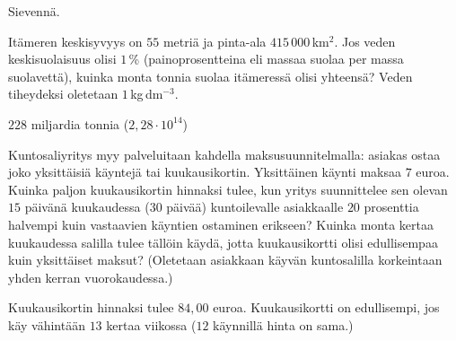 \begin{tehtava}
\begin{vastaus}
	\end{vastaus}
	\end{tehtava}

	\begin{tehtava}
Sievennä.
	 \begin{vastaus}
	 \end{vastaus}
	\end{tehtava}

\begin{tehtava}
Itämeren keskisyvyys on $55$ metriä ja pinta-ala $415\,000$\,km$^2$. Jos veden keskisuolaisuus olisi $1$\,\% (painoprosentteina eli massaa suolaa per massa suolavettä), kuinka monta tonnia suolaa itämeressä olisi yhteensä? Veden tiheydeksi oletetaan $1\,$kg\,dm$^{-3}$.
	\begin{vastaus}
	$228$ miljardia tonnia ($2,28\cdot10^{14}$)
	\end{vastaus}
\end{tehtava}	

	\begin{tehtava}
	\begin{vastaus}
	\alakohdat{
	§ $100$\,\%.
	§ $0,96$\,\%
	}
	\end{vastaus}
	\end{tehtava}
	
\begin{tehtava}
Kuntosaliyritys myy palveluitaan kahdella maksusuunnitelmalla: asiakas ostaa joko yksittäisiä käyntejä tai kuukausikortin. Yksittäinen käynti maksaa $7$ euroa. Kuinka paljon kuukausikortin hinnaksi tulee, kun yritys suunnittelee sen olevan $15$ päivänä kuukaudessa ($30$ päivää) kuntoilevalle asiakkaalle $20$ prosenttia halvempi kuin vastaavien käyntien ostaminen erikseen? Kuinka monta kertaa kuukaudessa salilla tulee tällöin käydä, jotta kuukausikortti olisi edullisempaa kuin yksittäiset maksut? (Oletetaan asiakkaan käyvän kuntosalilla korkeintaan yhden kerran vuorokaudessa.)
	\begin{vastaus}
Kuukausikortin hinnaksi tulee $84,00$ euroa. Kuukausikortti on edullisempi, jos käy vähintään $13$ kertaa viikossa ($12$ käynnillä hinta on sama.)
	\end{vastaus}	
\end{tehtava}	
	
